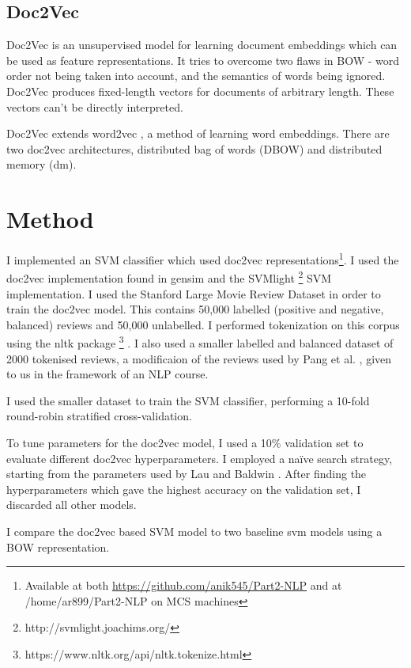 \documentclass[a4paper]{article}
\begin{document}
\begin{multicols}{2}
\subsection{Doc2Vec}

Doc2Vec is an unsupervised model for learning document embeddings which can be used as feature representations. It tries to overcome two flaws in BOW - word order not being taken into account, and the semantics of words being ignored. Doc2Vec produces fixed-length vectors for documents of arbitrary length. These vectors can't be directly interpreted. \cite{DBLP:journals/corr/LeM14}

Doc2Vec extends word2vec \cite{DBLP:journals/corr/MikolovSCCD13} , a method of learning word embeddings. There are two doc2vec architectures, distributed bag of words (DBOW) and distributed memory (dm).

\section{Method}

I implemented an SVM classifier which used doc2vec representations\footnote{Available at both \url{https://github.com/anik545/Part2-NLP} and at /home/ar899/Part2-NLP on MCS machines}. I used the doc2vec implementation found in gensim \cite{gensim} and the SVMlight \footnote{http://svmlight.joachims.org/} SVM implementation. I used the Stanford Large Movie Review Dataset \cite{maas-EtAl:2011:ACL-HLT2011} in order to train the doc2vec model. This contains 50,000 labelled (positive and negative, balanced) reviews and 50,000 unlabelled. I performed tokenization on this corpus using the nltk package \footnote{https://www.nltk.org/api/nltk.tokenize.html} \cite{bird-loper-2004-nltk}. I also used a smaller labelled and balanced dataset of 2000 tokenised reviews, a modificaion of the reviews used by Pang et al. \cite{pang2002thumbs}, given to us in the framework of an NLP course.

I used the smaller dataset to train the SVM classifier, performing a 10-fold round-robin stratified cross-validation. 

To tune parameters for the doc2vec model, I used a 10\% validation set to evaluate different doc2vec hyperparameters. I employed a naïve search strategy, starting from the parameters used by Lau and Baldwin \cite{lau2016empirical}. After finding the hyperparameters which gave the highest accuracy on the validation set, I discarded all other models.

I compare the doc2vec based SVM model to two baseline svm models using a BOW representation.


\end{multicols}
\end{document}
